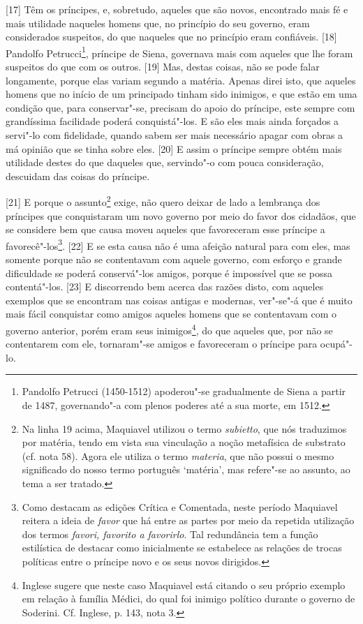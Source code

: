 {[}17{]} Têm os príncipes, e, sobretudo, aqueles que são novos,
encontrado mais fé e mais utilidade naqueles homens que, no princípio do
seu governo, eram considerados suspeitos, do que naqueles que no
princípio eram confiáveis. {[}18{]} Pandolfo Petrucci\footnote{Pandolfo
  Petrucci (1450-1512) apoderou"-se gradualmente de Siena a partir de
  1487, governando"-a com plenos poderes até a sua morte, em 1512.},
príncipe de Siena, governava mais com aqueles que lhe foram suspeitos do
que com os outros. {[}19{]} Mas, destas coisas, não se pode falar
longamente, porque elas variam segundo a matéria. Apenas direi isto, que
aqueles homens que no início de um principado tinham sido inimigos, e
que estão em uma condição que, para conservar"-se, precisam do apoio do
príncipe, este sempre com grandíssima facilidade poderá conquistá"-los. E
são eles mais ainda forçados a servi"-lo com fidelidade, quando sabem ser
mais necessário apagar com obras a má opinião que se tinha sobre eles.
{[}20{]} E assim o príncipe sempre obtém mais utilidade destes do que
daqueles que, servindo"-o com pouca consideração, descuidam das coisas do
príncipe.

{[}21{]} E porque o assunto\footnote{Na linha 19 acima, Maquiavel
  utilizou o termo \emph{subietto}, que nós traduzimos por matéria,
  tendo em vista sua vinculação a noção metafísica de substrato (cf.
  nota 58). Agora ele utiliza o termo \emph{materia}, que não possui o
  mesmo significado do nosso termo português `matéria', mas refere"-se ao
  assunto, ao tema a ser tratado.} exige, não quero deixar de lado a
lembrança dos príncipes que conquistaram um novo governo por meio do
favor dos cidadãos, que se considere bem que causa moveu aqueles que
favoreceram esse príncipe a favorecê"-los\footnote{Como destacam as
  edições Crítica e Comentada, neste período Maquiavel reitera a ideia
  de \emph{favor} que há entre as partes por meio da repetida utilização
  dos termos \emph{favori, favorito a favorirlo}. Tal redundância tem a
  função estilística de destacar como inicialmente se estabelece as
  relações de trocas políticas entre o príncipe novo e os seus novos
  dirigidos.}. {[}22{]} E se esta causa não é uma afeição natural para
com eles, mas somente porque não se contentavam com aquele governo, com
esforço e grande dificuldade se poderá conservá"-los amigos, porque é
impossível que se possa contentá"-los. {[}23{]} E discorrendo bem acerca
das razões disto, com aqueles exemplos que se encontram nas coisas
antigas e modernas, ver"-se"-á que é muito mais fácil conquistar como
amigos aqueles homens que se contentavam com o governo anterior, porém
eram seus inimigos\footnote{Inglese sugere que neste caso Maquiavel está
  citando o seu próprio exemplo em relação à família Médici, do qual foi
  inimigo político durante o governo de Soderini. Cf. Inglese, p. 143,
  nota 3.}, do que aqueles que, por não se contentarem com ele,
tornaram"-se amigos e favoreceram o príncipe para ocupá"-lo.

